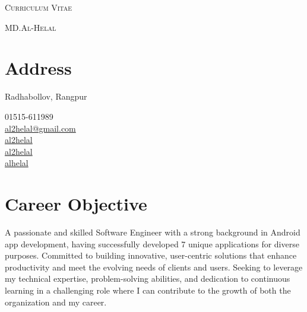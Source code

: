 \documentclass[a4paper,12pt]{article}
\begin{document}
\pagestyle{empty}

\begin{center}
\huge{\textsc{Curriculum Vitae}}
\vspace{\baselineskip}

\Large{\textsc{MD.Al-Helal}}\\
\end{center}
\vspace{1.5\baselineskip}
\section{Address}
\noindent
\begin{minipage}{.7\textwidth}
  Radhabollov, Rangpur\\
\end{minipage}
\begin{minipage}{.7\textwidth}
  \faPhone{} 01515-611989\\
  \faEnvelopeO{}  \href{mailto:al2helal@gmail.com}{al2helal@gmail.com}\\
  \faGithub{}  \href{https://github.com/al2helal}{al2helal}\\
  \faLinkedin{}  \href{https://www.linkedin.com/in/mdalhelal/}{al2helal}\\
  \faStackOverflow{}  \href{https://stackoverflow.com/users/5697418/alhelal}{alhelal}
\end{minipage}

\section{Career Objective}
\begin{CV}
\item A passionate and skilled Software Engineer with a strong background in Android app development, having successfully developed 7 unique applications for diverse purposes. Committed to building innovative, user-centric solutions that enhance productivity and meet the evolving needs of clients and users. Seeking to leverage my technical expertise, problem-solving abilities, and dedication to continuous learning in a challenging role where I can contribute to the growth of both the organization and my career.
  \end{CV}
\end{document}
